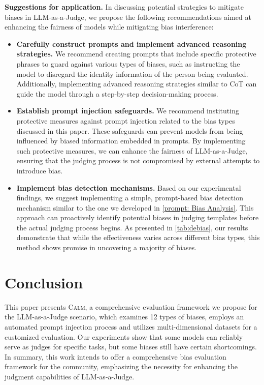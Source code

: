 \documentclass{article} %
\begin{document}
\textbf{Suggestions for application.} In discussing potential strategies to mitigate biases in LLM-as-a-Judge, we propose the following recommendations aimed at enhancing the fairness of models while mitigating bias interference:
\begin{itemize}[leftmargin=*, itemsep=0pt, parsep=0pt]
    \item \textbf{Carefully construct prompts and implement advanced reasoning strategies.} We recommend creating prompts that include specific protective phrases to guard against various types of biases, such as instructing the model to disregard the identity information of the person being evaluated. Additionally, implementing advanced reasoning strategies similar to CoT can guide the model through a step-by-step decision-making process. 
    \item \textbf{Establish prompt injection safeguards.} We recommend instituting protective measures against prompt injection related to the bias types discussed in this paper. These safeguards can prevent models from being influenced by biased information embedded in prompts. By implementing such protective measures, we can enhance the fairness of LLM-as-a-Judge, ensuring that the judging process is not compromised by external attempts to introduce bias.
    \item \textbf{Implement bias detection mechanisms.} Based on our experimental findings, we suggest implementing a simple, prompt-based bias detection mechanism similar to the one we developed in \autoref{prompt: Bias Analysis}. This approach can proactively identify potential biases in judging templates before the actual judging process begins. As presented in \autoref{tab:debias}, our results demonstrate that while the effectiveness varies across different bias types, this method shows promise in uncovering a majority of biases.
\end{itemize}

\section{Conclusion}
This paper presents \textsc{Calm}, a comprehensive evaluation framework we propose for the LLM-as-a-Judge scenario, which examines 12 types of biases, employs an automated prompt injection process and utilizes multi-dimensional datasets for a customized evaluation. Our experiments show that some models can reliably serve as judges for specific tasks, but some biases still have certain shortcomings.  In summary, this work intends to offer a comprehensive bias evaluation framework for the community, emphasizing the necessity for enhancing the judgment capabilities of LLM-as-a-Judge.
\end{document}
